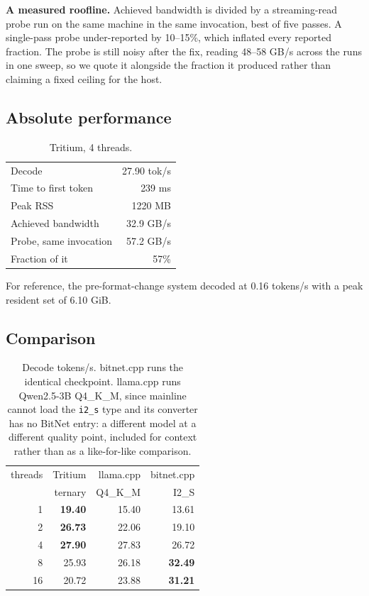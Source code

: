 \documentclass[10pt,twocolumn]{article}
\begin{document}
\textbf{A measured roofline.} Achieved bandwidth is divided by a streaming-read
probe run on the same machine in the same invocation, best of five passes. A
single-pass probe under-reported by 10--15\%, which inflated every reported
fraction. The probe is still noisy after the fix, reading 48--58 GB/s across the
runs in one sweep, so we quote it alongside the fraction it produced rather than
claiming a fixed ceiling for the host.

\subsection{Absolute performance}

\begin{table}[t]
\centering
\small
\begin{tabular}{lr}
\toprule
Decode                    & 27.90 tok/s \\
Time to first token       & 239 ms \\
Peak RSS                  & 1220 MB \\
Achieved bandwidth        & 32.9 GB/s \\
Probe, same invocation    & 57.2 GB/s \\
Fraction of it            & 57\% \\
\bottomrule
\end{tabular}
\caption{Tritium, 4 threads.}
\label{tab:abs}
\end{table}

For reference, the pre-format-change system decoded at 0.16 tokens/s with a peak
resident set of 6.10 GiB.

\subsection{Comparison}

\begin{table}[t]
\centering
\small
\begin{tabular}{rrrr}
\toprule
threads & Tritium & llama.cpp & bitnet.cpp \\
        & ternary & Q4\_K\_M  & I2\_S \\
\midrule
1  & \textbf{19.40} & 15.40 & 13.61 \\
2  & \textbf{26.73} & 22.06 & 19.10 \\
4  & \textbf{27.90} & 27.83 & 26.72 \\
8  & 25.93 & 26.18 & \textbf{32.49} \\
16 & 20.72 & 23.88 & \textbf{31.21} \\
\bottomrule
\end{tabular}
\caption{Decode tokens/s. bitnet.cpp runs the identical checkpoint. llama.cpp
runs Qwen2.5-3B Q4\_K\_M, since mainline cannot load the \texttt{i2\_s} type and
its converter has no BitNet entry: a different model at a different quality
point, included for context rather than as a like-for-like comparison.}
\label{tab:compare}
\end{table}
\end{document}
